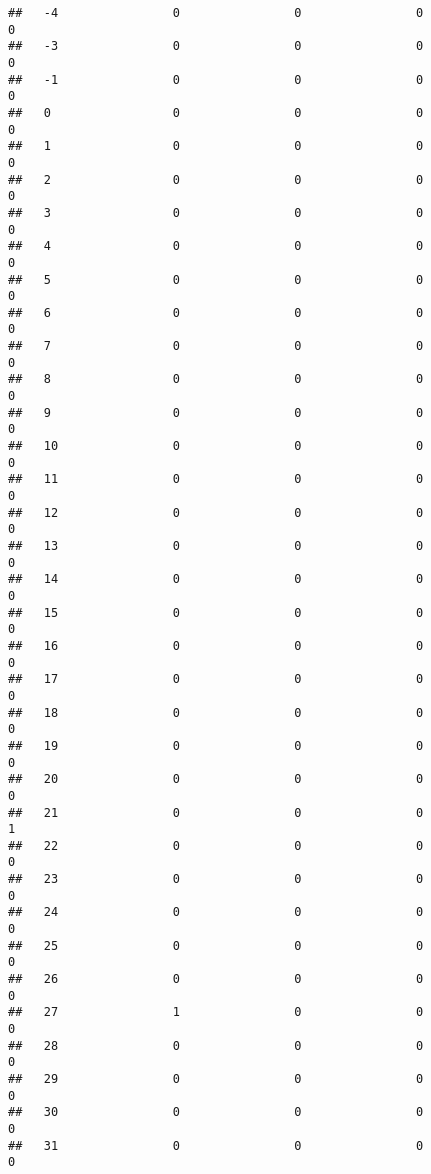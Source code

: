 \documentclass[]{article}
\begin{document}
\begin{verbatim}
##   -4                0                0                0                0
##   -3                0                0                0                0
##   -1                0                0                0                0
##   0                 0                0                0                0
##   1                 0                0                0                0
##   2                 0                0                0                0
##   3                 0                0                0                0
##   4                 0                0                0                0
##   5                 0                0                0                0
##   6                 0                0                0                0
##   7                 0                0                0                0
##   8                 0                0                0                0
##   9                 0                0                0                0
##   10                0                0                0                0
##   11                0                0                0                0
##   12                0                0                0                0
##   13                0                0                0                0
##   14                0                0                0                0
##   15                0                0                0                0
##   16                0                0                0                0
##   17                0                0                0                0
##   18                0                0                0                0
##   19                0                0                0                0
##   20                0                0                0                0
##   21                0                0                0                1
##   22                0                0                0                0
##   23                0                0                0                0
##   24                0                0                0                0
##   25                0                0                0                0
##   26                0                0                0                0
##   27                1                0                0                0
##   28                0                0                0                0
##   29                0                0                0                0
##   30                0                0                0                0
##   31                0                0                0                0

\end{verbatim}
\end{document}
